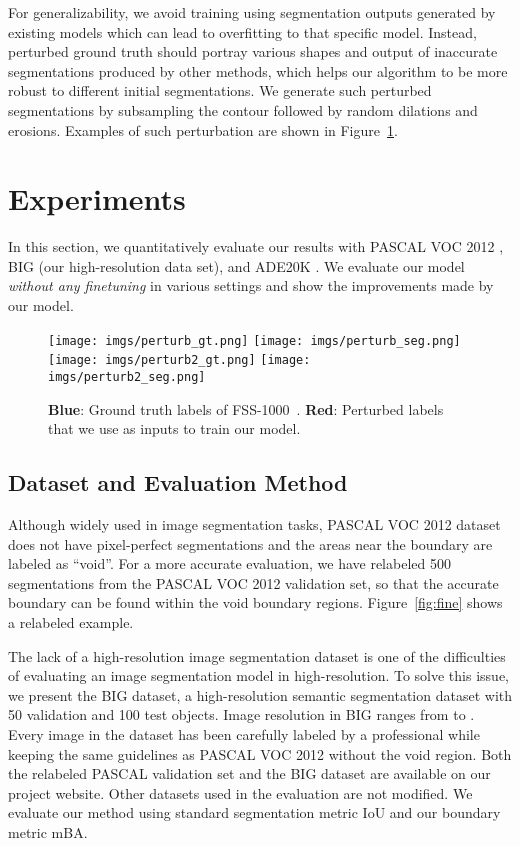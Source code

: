 \documentclass[10pt,twocolumn,letterpaper]{article}
\begin{document}
For generalizability, we avoid training using segmentation outputs generated by existing models which can lead to overfitting to that specific model. 
Instead, perturbed ground truth should portray various shapes and output of inaccurate segmentations produced by other methods, which helps our algorithm to be more robust to different initial segmentations. We generate such perturbed segmentations by subsampling the contour followed by random dilations and erosions. Examples of such perturbation are shown in Figure~\ref{fig:perturb}.

\section{Experiments}
In this section, we quantitatively evaluate our results with PASCAL VOC 2012 \cite{Pascal}, BIG (our high-resolution data set), and ADE20K \cite{zhou2017scene}. We evaluate our model \textit{without any finetuning} in various settings and show the improvements made by our model. 


\begin{figure}[t]
	\texttt{[image: imgs/perturb\_gt.png]}
	\endminipage\hfill
	\texttt{[image: imgs/perturb\_seg.png]}
	\endminipage\hfill
	\texttt{[image: imgs/perturb2\_gt.png]}
	\endminipage\hfill
	\texttt{[image: imgs/perturb2\_seg.png]}
	\endminipage\hfill
	\caption{\textbf{Blue}: Ground truth labels of FSS-1000~\cite{FSS1000}.
	\textbf{Red}: Perturbed labels that we use as inputs to train our model.}
	\label{fig:perturb}
	\vspace{-0.15in}
\end{figure}


\subsection{Dataset and Evaluation Method} \label{sec:eval_method}
Although widely used in image segmentation tasks, PASCAL VOC 2012 dataset does not have pixel-perfect segmentations and the areas near the boundary are labeled as ``void''. For a more accurate evaluation, we have relabeled 500 segmentations from the PASCAL VOC 2012 validation set, so that the accurate boundary can be found within the void boundary regions. Figure~\ref{fig:fine} shows a relabeled example.

The lack of a high-resolution image segmentation dataset is one of the difficulties of evaluating an image segmentation model in high-resolution. To solve this issue, we present the BIG dataset, a high-resolution semantic segmentation dataset with 50 validation and 100 test objects. Image resolution in BIG ranges from  to . Every image in the dataset has been carefully labeled by a professional while keeping the same guidelines as PASCAL VOC 2012 without the void region. 
Both the relabeled PASCAL validation set and the BIG dataset are available on our project website.
Other datasets used in the evaluation are not modified.
We evaluate our method using standard segmentation metric IoU and our boundary metric mBA.
\end{document}

